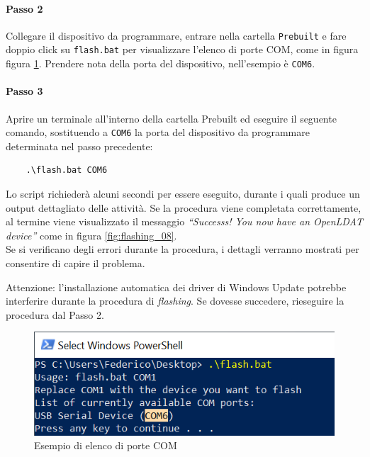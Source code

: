 \paragraph{Passo 2} Collegare il dispositivo da programmare, entrare nella cartella \texttt{Prebuilt} e fare doppio click su \texttt{flash.bat} per visualizzare l'elenco di porte COM, come in figura figura \ref{fig:flashing_07}. Prendere nota della porta del dispositivo, nell'esempio è \texttt{COM6}.

\paragraph{Passo 3} Aprire un terminale all'interno della cartella Prebuilt ed eseguire il seguente comando, sostituendo a \texttt{COM6} la porta del dispositivo da programmare determinata nel passo precedente:
\begin{verbatim}
	.\flash.bat COM6
\end{verbatim}

Lo script richiederà alcuni secondi per essere eseguito, durante i quali produce un output dettagliato delle attività. Se la procedura viene completata correttamente, al termine viene visualizzato il messaggio \textit{``Successs! You now have an OpenLDAT device''} come in figura \ref{fig:flashing_08}.\\
Se si verificano degli errori durante la procedura, i dettagli verranno mostrati per consentire di capire il problema.

Attenzione: l'installazione automatica dei driver di Windows Update potrebbe interferire durante la procedura di \textit{flashing}. Se dovesse succedere, rieseguire la procedura dal Passo 2.

\begin{figure}[H]
	\centering
	\includegraphics[width=.7\textwidth]{Dispositivo_files/flashing_07.png}
	\caption{Esempio di elenco di porte COM}
	\label{fig:flashing_07}
\end{figure}

